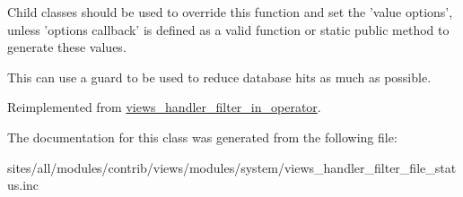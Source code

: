 Child classes should be used to override this function and set the 'value options', unless 'options callback' is defined as a valid function or static public method to generate these values.

This can use a guard to be used to reduce database hits as much as possible. 

Reimplemented from \hyperlink{classviews__handler__filter__in__operator_a5b5df6d90f4359ed28c0c446bdc81a6}{views\_\-handler\_\-filter\_\-in\_\-operator}.

The documentation for this class was generated from the following file:\begin{CompactItemize}
\item 
sites/all/modules/contrib/views/modules/system/views\_\-handler\_\-filter\_\-file\_\-status.inc\end{CompactItemize}
